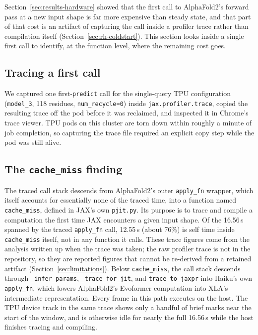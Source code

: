 
Section~\ref{sec:results-hardware} showed that the first call to
AlphaFold2's forward pass at a new input shape is far more expensive
than steady state, and that part of that cost is an artifact of
capturing the call inside a profiler trace rather than compilation
itself (Section~\ref{sec:rh-coldstart}). This section looks inside a single
first call to identify, at the function level, where the remaining
cost goes.

\subsection{Tracing a first call}
\label{sec:prof-method}

We captured one first-\texttt{predict} call for the single-query TPU
configuration (\texttt{model\_3}, 118 residues, \texttt{num\_recycle=0})
inside \texttt{jax.profiler.trace}, copied the resulting trace off the
pod before it was reclaimed, and inspected it in Chrome's trace
viewer. TPU pods on this cluster are torn down within roughly a
minute of job completion, so capturing the trace file required an
explicit copy step while the pod was still alive.

\subsection{The \texttt{cache\_miss} finding}
\label{sec:prof-cachemiss}

The traced call stack descends from AlphaFold2's outer
\texttt{apply\_fn} wrapper, which itself accounts for essentially none
of the traced time, into a function named \texttt{cache\_miss}, defined
in JAX's own \texttt{pjit.py}. Its purpose is to trace and compile a
computation the first time JAX encounters a given input shape. Of the
16.56\,s spanned by the traced \texttt{apply\_fn} call, 12.55\,s (about
76\%) is self time inside \texttt{cache\_miss} itself, not in any
function it calls. These trace figures come from the analysis written
up when the trace was taken; the raw profiler trace is not in the
repository, so they are reported figures that cannot be re-derived
from a retained artifact (Section~\ref{sec:limitations}).
Below \texttt{cache\_miss}, the call stack descends through
\texttt{\_infer\_params}, \texttt{\_trace\_for\_jit}, and
\texttt{trace\_to\_jaxpr} into Haiku's own \texttt{apply\_fn}, which
lowers AlphaFold2's Evoformer computation into XLA's intermediate
representation. Every frame in this path executes on the host. The
TPU device track in the same trace shows only a handful of brief
marks near the start of the window, and is otherwise idle for nearly
the full 16.56\,s while the host finishes tracing and compiling.

